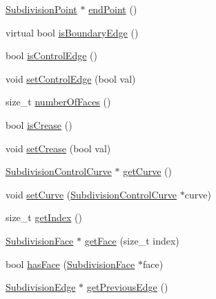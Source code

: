 \begin{DoxyCompactItemize}
\item 
\hyperlink{classShipCADGeometry_1_1SubdivisionPoint}{Subdivision\-Point} $\ast$ \hyperlink{classShipCADGeometry_1_1SubdivisionEdge_a6d98a4d163b1beae788038f36b5ee2fe}{end\-Point} ()
\item 
virtual bool \hyperlink{classShipCADGeometry_1_1SubdivisionEdge_ad95a3ec8ba66deb74cbfd3d36428fc34}{is\-Boundary\-Edge} ()
\item 
bool \hyperlink{classShipCADGeometry_1_1SubdivisionEdge_ae47df0c89e604d2185c12ef1be43e535}{is\-Control\-Edge} ()
\item 
void \hyperlink{classShipCADGeometry_1_1SubdivisionEdge_aef8475bab828f5e100dd12699f0aad9b}{set\-Control\-Edge} (bool val)
\item 
size\-\_\-t \hyperlink{classShipCADGeometry_1_1SubdivisionEdge_a9120bf0ef10c838cd69e402eecd8c896}{number\-Of\-Faces} ()
\item 
bool \hyperlink{classShipCADGeometry_1_1SubdivisionEdge_a26be9f91b5fae2c62b99ea501e4a6015}{is\-Crease} ()
\item 
void \hyperlink{classShipCADGeometry_1_1SubdivisionEdge_ad0313b8844a81c5802533376a09fce99}{set\-Crease} (bool val)
\item 
\hyperlink{classShipCADGeometry_1_1SubdivisionControlCurve}{Subdivision\-Control\-Curve} $\ast$ \hyperlink{classShipCADGeometry_1_1SubdivisionEdge_afb80c9ae06d2bb9bb596e2eac6efa993}{get\-Curve} ()
\item 
void \hyperlink{classShipCADGeometry_1_1SubdivisionEdge_a6412679e0438dac8545200df59480783}{set\-Curve} (\hyperlink{classShipCADGeometry_1_1SubdivisionControlCurve}{Subdivision\-Control\-Curve} $\ast$curve)
\item 
size\-\_\-t \hyperlink{classShipCADGeometry_1_1SubdivisionEdge_a4be990243bb29ead43c76171197130d5}{get\-Index} ()
\item 
\hyperlink{classShipCADGeometry_1_1SubdivisionFace}{Subdivision\-Face} $\ast$ \hyperlink{classShipCADGeometry_1_1SubdivisionEdge_a55dc9daab165567ed40e37f9e01ee766}{get\-Face} (size\-\_\-t index)
\item 
bool \hyperlink{classShipCADGeometry_1_1SubdivisionEdge_a286bc4d7959703a153945e3bcb9c9ad3}{has\-Face} (\hyperlink{classShipCADGeometry_1_1SubdivisionFace}{Subdivision\-Face} $\ast$face)
\item 
\hyperlink{classShipCADGeometry_1_1SubdivisionEdge}{Subdivision\-Edge} $\ast$ \hyperlink{classShipCADGeometry_1_1SubdivisionEdge_a7c1fe2cad6e7b8a0e532768b4a395137}{get\-Previous\-Edge} ()
\item 

\end{DoxyCompactItemize}
